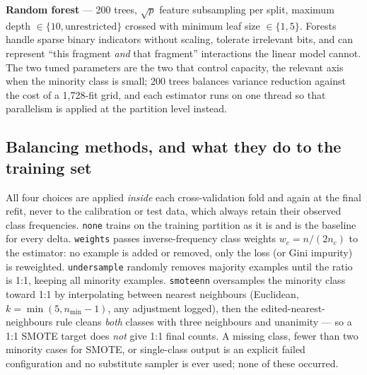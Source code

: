 \documentclass[10pt,letterpaper]{article}
\begin{document}
\textbf{Random forest} --- 200 trees, $\sqrt{p}$ feature subsampling per split, maximum depth
$\in \{10, \text{unrestricted}\}$ crossed with minimum leaf size $\in \{1, 5\}$. Forests handle
sparse binary indicators without scaling, tolerate irrelevant bits, and can represent ``this fragment
\emph{and} that fragment'' interactions the linear model cannot. The two tuned parameters are the two
that control capacity, the relevant axis when the minority class is small; 200 trees balances
variance reduction against the cost of a 1{,}728-fit grid, and each estimator runs on one thread so
that parallelism is applied at the partition level instead.

\subsection{Balancing methods, and what they do to the training set}

All four choices are applied \emph{inside} each cross-validation fold and again at the final refit,
never to the calibration or test data, which always retain their observed class frequencies.
\texttt{none} trains on the training partition as it is and is the baseline for every delta.
\texttt{weights} passes inverse-frequency class weights $w_c = n/(2n_c)$ to the estimator: no example
is added or removed, only the loss (or Gini impurity) is reweighted. \texttt{undersample} randomly
removes majority examples until the ratio is 1:1, keeping all minority examples. \texttt{smoteenn}
oversamples the minority class toward 1:1 by interpolating between nearest neighbours (Euclidean,
$k=\min(5, n_{\min}-1)$, any adjustment logged), then the edited-nearest-neighbours rule cleans
\emph{both} classes with three neighbours and unanimity --- so a 1:1 SMOTE target does \emph{not}
give 1:1 final counts. A missing class, fewer than two minority cases for SMOTE, or single-class
output is an explicit failed configuration and no substitute sampler is ever used; none of these
occurred.
\end{document}
